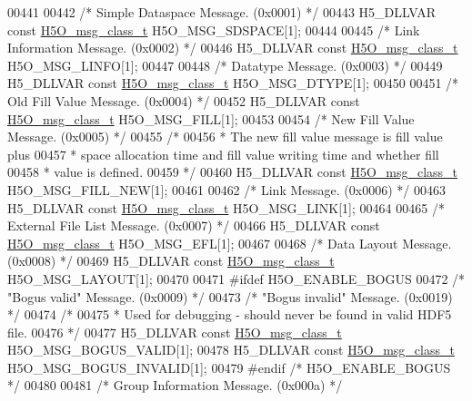 \begin{DoxyCode}
00441 
00442 \textcolor{comment}{/* Simple Dataspace Message. (0x0001) */}
00443 H5\_DLLVAR \textcolor{keyword}{const} \hyperlink{struct_h5_o__msg__class__t}{H5O\_msg\_class\_t} H5O\_MSG\_SDSPACE[1];
00444 
00445 \textcolor{comment}{/* Link Information Message. (0x0002) */}
00446 H5\_DLLVAR \textcolor{keyword}{const} \hyperlink{struct_h5_o__msg__class__t}{H5O\_msg\_class\_t} H5O\_MSG\_LINFO[1];
00447 
00448 \textcolor{comment}{/* Datatype Message. (0x0003) */}
00449 H5\_DLLVAR \textcolor{keyword}{const} \hyperlink{struct_h5_o__msg__class__t}{H5O\_msg\_class\_t} H5O\_MSG\_DTYPE[1];
00450 
00451 \textcolor{comment}{/* Old Fill Value Message. (0x0004) */}
00452 H5\_DLLVAR \textcolor{keyword}{const} \hyperlink{struct_h5_o__msg__class__t}{H5O\_msg\_class\_t} H5O\_MSG\_FILL[1];
00453 
00454 \textcolor{comment}{/* New Fill Value Message. (0x0005) */}
00455 \textcolor{comment}{/*}
00456 \textcolor{comment}{ * The new fill value message is fill value plus}
00457 \textcolor{comment}{ * space allocation time and fill value writing time and whether fill}
00458 \textcolor{comment}{ * value is defined.}
00459 \textcolor{comment}{ */}
00460 H5\_DLLVAR \textcolor{keyword}{const} \hyperlink{struct_h5_o__msg__class__t}{H5O\_msg\_class\_t} H5O\_MSG\_FILL\_NEW[1];
00461 
00462 \textcolor{comment}{/* Link Message. (0x0006) */}
00463 H5\_DLLVAR \textcolor{keyword}{const} \hyperlink{struct_h5_o__msg__class__t}{H5O\_msg\_class\_t} H5O\_MSG\_LINK[1];
00464 
00465 \textcolor{comment}{/* External File List Message. (0x0007) */}
00466 H5\_DLLVAR \textcolor{keyword}{const} \hyperlink{struct_h5_o__msg__class__t}{H5O\_msg\_class\_t} H5O\_MSG\_EFL[1];
00467 
00468 \textcolor{comment}{/* Data Layout Message. (0x0008) */}
00469 H5\_DLLVAR \textcolor{keyword}{const} \hyperlink{struct_h5_o__msg__class__t}{H5O\_msg\_class\_t} H5O\_MSG\_LAYOUT[1];
00470 
00471 \textcolor{preprocessor}{#ifdef H5O\_ENABLE\_BOGUS}
00472 \textcolor{comment}{/* "Bogus valid" Message. (0x0009) */}
00473 \textcolor{comment}{/* "Bogus invalid" Message. (0x0019) */}
00474 \textcolor{comment}{/*}
00475 \textcolor{comment}{ * Used for debugging - should never be found in valid HDF5 file.}
00476 \textcolor{comment}{ */}
00477 H5\_DLLVAR \textcolor{keyword}{const} \hyperlink{struct_h5_o__msg__class__t}{H5O\_msg\_class\_t} H5O\_MSG\_BOGUS\_VALID[1];
00478 H5\_DLLVAR \textcolor{keyword}{const} \hyperlink{struct_h5_o__msg__class__t}{H5O\_msg\_class\_t} H5O\_MSG\_BOGUS\_INVALID[1];
00479 \textcolor{preprocessor}{#endif }\textcolor{comment}{/* H5O\_ENABLE\_BOGUS */}\textcolor{preprocessor}{}
00480 
00481 \textcolor{comment}{/* Group Information Message. (0x000a) */}

\end{DoxyCode}
